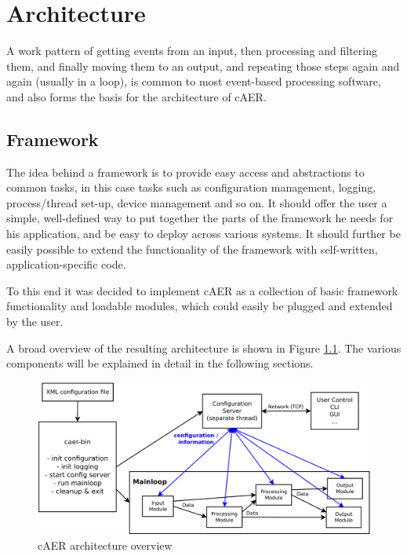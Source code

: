 \documentclass[a4paper,12pt]{report}
\begin{document}
\chapter{Architecture} \label{chap:architecture}

A work pattern of getting events from an input, then processing and filtering them, and finally moving them to an output, and repeating those steps again and again (usually in a loop), is common to most event-based processing software, and also forms the basis for the architecture of cAER.

\section{Framework} \label{sec:framework}

The idea behind a framework is to provide easy access and abstractions to common tasks, in this case tasks such as configuration management, logging, process/thread set-up, device management and so on.
It should offer the user a simple, well-defined way to put together the parts of the framework he needs for his application, and be easy to deploy across various systems.
It should further be easily possible to extend the functionality of the framework with self-written, application-specific code.

To this end it was decided to implement cAER as a collection of basic framework functionality and loadable modules, which could easily be plugged and extended by the user.

A broad overview of the resulting architecture is shown in Figure \ref{fig:caer_architecture}. The various components will be explained in detail in the following sections.

\begin{figure}[H]
\begin{center}
\includegraphics[width=\textwidth]{caer_architecture}
\caption{cAER architecture overview}
\label{fig:caer_architecture}
\end{center}
\end{figure}
\end{document}
